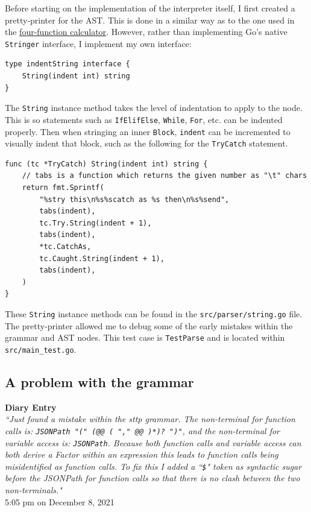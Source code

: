 \documentclass[]{full}
\theoremstyle{definition}
\begin{document}
Before starting on the implementation of the interpreter itself, I first created a pretty-printer for the AST. This is done in a similar way as to the one used in the \hyperref[sec:four-function-calc]{four-function calculator}. However, rather than implementing Go's native \verb|Stringer| interface, I implement my own interface:

\begin{verbatim}
type indentString interface {
    String(indent int) string
}
\end{verbatim}

The \verb|String| instance method takes the level of indentation to apply to the node. This is so statements such as \verb|IfElifElse|, \verb|While|, \verb|For|, etc. can be indented properly. Then when stringing an inner \verb|Block|, \verb|indent| can be incremented to visually indent that block, such as the following for the \verb|TryCatch| statement.

\begin{verbatim}
func (tc *TryCatch) String(indent int) string {
    // tabs is a function which returns the given number as "\t" chars
    return fmt.Sprintf(
        "%stry this\n%s%scatch as %s then\n%s%send",
        tabs(indent),
        tc.Try.String(indent + 1),
        tabs(indent),
        *tc.CatchAs,
        tc.Caught.String(indent + 1),
        tabs(indent),
    )
}
\end{verbatim}

These \verb|String| instance methods can be found in the \verb|src/parser/string.go| file. The pretty-printer allowed me to debug some of the early mistakes within the grammar and AST nodes. This test case is \verb|TestParse| and is located within \verb|src/main_test.go|.

\subsection{A problem with the grammar}

\begin{center}
    \textbf{Diary Entry}\\[0.5em]
    \cprotect\textit{``Just found a mistake within the sttp grammar. The non-terminal for function calls is: \verb|JSONPath "(" (@@ ( "," @@ )*)? ")"|, and the non-terminal for variable access is: \verb|JSONPath|. Because both function calls and variable access can both derive a Factor within an expression this leads to function calls being misidentified as function calls. To fix this I added a ``\verb|$|" token as syntactic sugar before the JSONPath for function calls so that there is no clash between the two non-terminals."}\\[0.5em]
    \tiny{5:05 pm on December 8, 2021}
\end{center}
\end{document}

